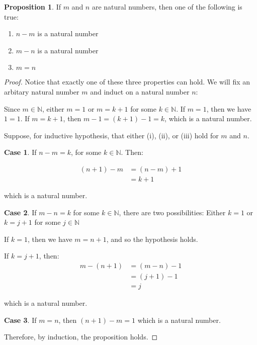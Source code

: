 \documentclass[12pt, letterpaper]{article}
\newcommand{\N}{\mathbb{N}}
\theoremstyle{definition} %
\newtheorem*{prop}{Proposition}
\newtheorem{case}{Case}[subsection]
\begin{document}
\begin{prop}
    If $m$ and $n$ are natural numbers, then one of the following is true:
    \begin{enumerate}[label=(\roman{*})]
        \item $n-m$ is a natural number
        \item $m-n$ is a natural number
        \item $m=n$
    \end{enumerate}

    \begin{proof}
        Notice that exactly one of these three properties can hold. We will fix 
        an arbitary natural number $m$ and induct on a natural number $n$: 
        
        Since $m \in \N$, either $m=1$ or $m=k+1$ for some $k \in \N$. If $m=1$,
        then we have $1=1$. If $m=k+1$, then $m-1 = (k+1)-1 = k$, which is a 
        natural number.

        Suppose, for inductive hypothesis, that either (i), (ii), or (iii) hold 
        for $m$ and $n$. 

        \begin{case}
            If $n-m=k$, for some $k \in \N$. Then:

            \begin{align*}
                (n+1)-m &= (n-m) + 1    \\
                        &= k + 1
            \end{align*}

            which is a natural number.
        \end{case}

        \begin{case}
            If $m-n=k$ for some $k \in \N$, there are two possibilities: 
            Either $k=1$ or $k=j+1$ for some $j\in\N$

            If $k=1$, then we have $m=n+1$, and so the hypothesis holds.

            If $k=j+1$, then:
            \begin{align*}
                m -(n+1) &= (m-n) - 1   \\
                         &= (j+1) - 1   \\
                         &= j
            \end{align*}

            which is a natural number. 
        \end{case}

        \begin{case}
            If $m=n$, then $(n+1)-m = 1$ which is a natural number.
        \end{case}

        Therefore, by induction, the proposition holds.
    \end{proof}
\end{prop} 
\end{document}
